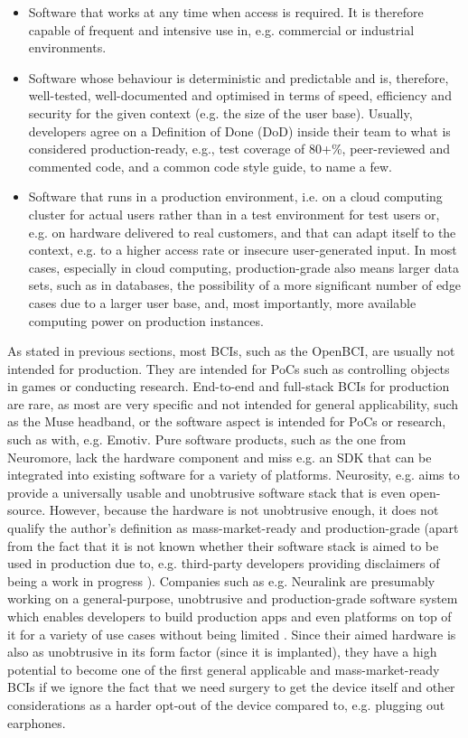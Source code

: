 \begin{itemize}
  \item Software that works at any time when access is required. It is therefore capable of frequent and intensive use in, e.g. commercial or industrial environments.
  \item Software whose behaviour is deterministic and predictable and is, therefore, well-tested, well-documented and optimised in terms of speed, efficiency and security for the given context (e.g. the size of the user base). Usually, developers agree on a Definition of Done (DoD) inside their team to what is considered production-ready, e.g., test coverage of 80+\%, peer-reviewed and commented code, and a common code style guide, to name a few.
  \item Software that runs in a production environment, i.e. on a cloud computing cluster for actual users rather than in a test environment for test users or, e.g. on hardware delivered to real customers, and that can adapt itself to the context, e.g. to a higher access rate or insecure user-generated input. In most cases, especially in cloud computing, production-grade also means larger data sets, such as in databases, the possibility of a more significant number of edge cases due to a larger user base, and, most importantly, more available computing power on production instances.
\end{itemize}

As stated in previous sections, most BCIs, such as the OpenBCI, are usually not intended for production. They are intended for PoCs such as controlling objects in games or conducting research. End-to-end and full-stack BCIs for production are rare, as most are very specific and not intended for general applicability, such as the Muse headband, or the software aspect is intended for PoCs or research, such as with, e.g. Emotiv. Pure software products, such as the one from Neuromore, lack the hardware component and miss e.g. an SDK that can be integrated into existing software for a variety of platforms. Neurosity, e.g. aims to provide a universally usable and unobtrusive software stack that is even open-source. However, because the hardware is not unobtrusive enough, it does not qualify the author's definition as mass-market-ready and production-grade (apart from the fact that it is not known whether their software stack is aimed to be used in production \citep{neurosity_neurosity_2022} due to, e.g. third-party developers providing disclaimers of being a work in progress \citep{turney_notion_2022}). Companies such as e.g. Neuralink are presumably working on a general-purpose, unobtrusive and production-grade software system which enables developers to build production apps and even platforms on top of it for a variety of use cases without being limited \citep{musk_integrated_2019}. Since their aimed hardware is also as unobtrusive in its form factor (since it is implanted), they have a high potential to become one of the first general applicable and mass-market-ready BCIs if we ignore the fact that we need surgery to get the device itself \citep{neuralink_approach_nodate} and other considerations as a harder opt-out of the device compared to, e.g. plugging out earphones.

